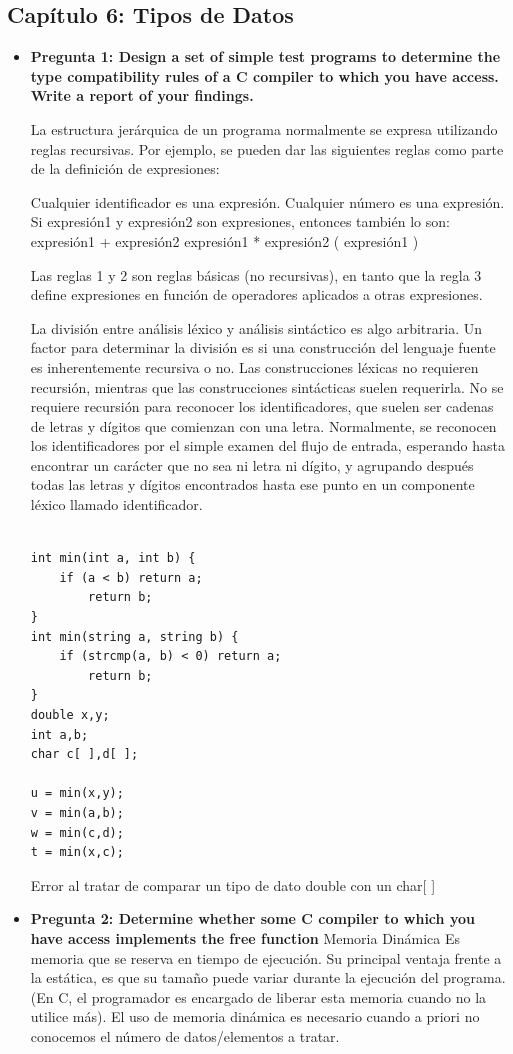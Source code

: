 \documentclass[12pt,oneside]{article}
\begin{document}
		\subsection{Capítulo 6: Tipos de Datos}
			\begin{itemize}
				\item {\bf Pregunta 1: Design a set of simple test programs to determine the type compatibility
rules of a C compiler to which you have access. Write a report of your findings.}

La estructura jerárquica de un programa normalmente se expresa utilizando reglas recursivas. Por ejemplo, se pueden dar las siguientes reglas como parte de la definición de expresiones:

    Cualquier identificador es una expresión.
    Cualquier número es una expresión.
    Si expresión1 y expresión2 son expresiones, entonces también lo son:
        expresión1 + expresión2
        expresión1 * expresión2
        ( expresión1 )

Las reglas 1 y 2 son reglas básicas (no recursivas), en tanto que la regla 3 define expresiones en función de operadores aplicados a otras expresiones.

La división entre análisis léxico y análisis sintáctico es algo arbitraria. Un factor para determinar la división es si una construcción del lenguaje fuente es inherentemente recursiva o no. Las construcciones léxicas no requieren recursión, mientras que las construcciones sintácticas suelen requerirla. No se requiere recursión para reconocer los identificadores, que suelen ser cadenas de letras y dígitos que comienzan con una letra. Normalmente, se reconocen los identificadores por el simple examen del flujo de entrada, esperando hasta encontrar un carácter que no sea ni letra ni dígito, y agrupando después todas las letras y dígitos encontrados hasta ese punto en un componente léxico llamado identificador.


\begin{lstlisting}[frame = single] 

int min(int a, int b) { 
	if (a < b) return a;
		return b;
}	
int min(string a, string b) { 
	if (strcmp(a, b) < 0) return a;
		return b;
}
double x,y;
int a,b;
char c[ ],d[ ];

u = min(x,y);
v = min(a,b); 
w = min(c,d);
t = min(x,c); 

\end{lstlisting}
Error al tratar de comparar un tipo de
 dato double con un char[ ]

					
				\item {\bf Pregunta 2: Determine whether some C compiler to which you have access implements
the free function}
Memoria Dinámica 
Es memoria que se reserva en tiempo de ejecución. Su principal ventaja frente a la estática, es que su tamaño puede variar durante la ejecución del programa. (En C, el programador es encargado de liberar esta memoria cuando no la utilice más). El uso de memoria dinámica es necesario cuando a priori no conocemos el número de datos/elementos a tratar.


\end{itemize}
\end{document}
